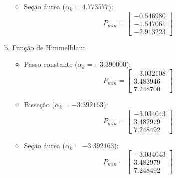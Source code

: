 \documentclass[10pt, a4paper]{article}
\begin{document}
\begin{enumerate}[(a)]
\begin{itemize}
\[        \] 
    \item Seção áurea ($\alpha_k = 4.773577$): \\
       \[
            P_{min} = \left[ {\begin{array}{c}
                         -0.546980\\ -1.547061\\ -2.913223
        \end{array} } \right]
        \] 
    \end{itemize}
    \item Função de Himmelblau: 
    \begin{itemize}
    \item Passo constante ($\alpha_k = -3.390000$): \\
        \[
            P_{min} = \left[ {\begin{array}{c}
                         -3.032108\\ 3.483946\\ 7.248700
        \end{array} } \right]
        \] 
    \item Bisseção ($\alpha_k = -3.392163$): \\
        \[
            P_{min} = \left[ {\begin{array}{c}
                         -3.034043\\ 3.482979\\ 7.248492
        \end{array} } \right]
        \] 
    \item Seção áurea ($\alpha_k = -3.392163$): \\
       \[
            P_{min} = \left[ {\begin{array}{c}
                         -3.034043\\ 3.482979\\ 7.248492
        \end{array} } \right]
        \]
    \end{itemize} 
  \end{enumerate}




\end{document}
